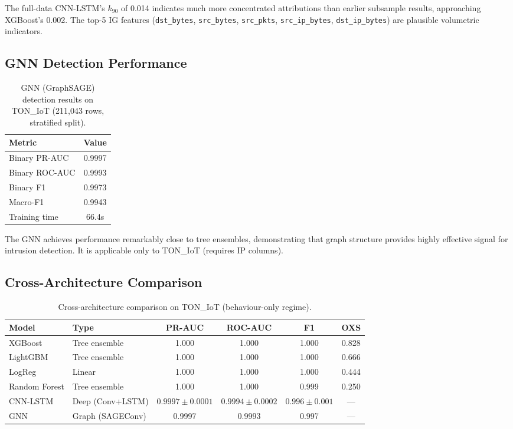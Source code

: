 \documentclass[12pt,a4paper]{report}
\begin{document}
The full-data CNN-LSTM's $k_{90}$ of 0.014 indicates much more concentrated attributions than earlier subsample results, approaching XGBoost's 0.002. The top-5 IG features (\texttt{dst\_bytes}, \texttt{src\_bytes}, \texttt{src\_pkts}, \texttt{src\_ip\_bytes}, \texttt{dst\_ip\_bytes}) are plausible volumetric indicators.

\subsection{GNN Detection Performance}
\label{sec:gnn-results}

\begin{table}[H]
\centering
\caption{GNN (GraphSAGE) detection results on TON\_IoT (211,043 rows, stratified split).}
\label{tab:gnn}
\begin{tabular}{lc}
\toprule
\textbf{Metric} & \textbf{Value} \\
\midrule
Binary PR-AUC & 0.9997 \\
Binary ROC-AUC & 0.9993 \\
Binary F1 & 0.9973 \\
Macro-F1 & 0.9943 \\
Training time & 66.4s \\
\bottomrule
\end{tabular}
\end{table}

The GNN achieves performance remarkably close to tree ensembles, demonstrating that graph structure provides highly effective signal for intrusion detection. It is applicable only to TON\_IoT (requires IP columns).

\subsection{Cross-Architecture Comparison}
\label{sec:arch-comparison}

\begin{table}[H]
\centering
\caption{Cross-architecture comparison on TON\_IoT (behaviour-only regime).}
\label{tab:all-models}
\begin{tabular}{llcccc}
\toprule
\textbf{Model} & \textbf{Type} & \textbf{PR-AUC} & \textbf{ROC-AUC} & \textbf{F1} & \textbf{OXS} \\
\midrule
XGBoost & Tree ensemble & 1.000 & 1.000 & 1.000 & 0.828 \\
LightGBM & Tree ensemble & 1.000 & 1.000 & 1.000 & 0.666 \\
LogReg & Linear & 1.000 & 1.000 & 1.000 & 0.444 \\
Random Forest & Tree ensemble & 1.000 & 1.000 & 0.999 & 0.250 \\
CNN-LSTM & Deep (Conv+LSTM) & $0.9997 \pm 0.0001$ & $0.9994 \pm 0.0002$ & $0.996 \pm 0.001$ & --- \\
GNN & Graph (SAGEConv) & 0.9997 & 0.9993 & 0.997 & --- \\
\bottomrule
\end{tabular}
\end{table}
\end{document}
